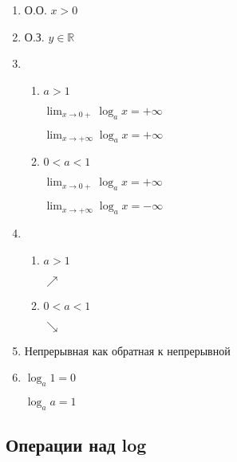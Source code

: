 \documentclass{article}
\begin{document}
    \begin{enumerate}
        \item О.О. \(x > 0\)
        \item О.З. \(y \in \mathbb{R}\)
        \item 
        \begin{enumerate}
            \item \(a > 1\)

            \(\lim_{x \to 0+} \log_a x = +\infty\)

            \(\lim_{x \to +\infty} \log_a x = +\infty\)
            
            \item \(0 < a < 1\)

            \(\lim_{x \to 0+} \log_a x = +\infty\)
            
            \(\lim_{x \to +\infty} \log_a x = -\infty\)
        \end{enumerate}
        \item
        \begin{enumerate}
            \item \( a > 1 \) 
            
            \( \nearrow \)

            \item \( 0 < a < 1 \)
            
            \( \searrow \) 
        \end{enumerate}

        \item Непрерывная как обратная к непрерывной
        \item
        
        \( \log_a 1 = 0 \) 

        \( \log_a a = 1 \)
        
    \end{enumerate}

    \subsection{Операции над log}
\end{document}
